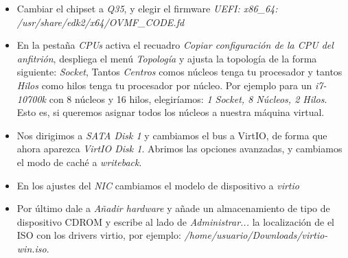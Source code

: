\documentclass[12pt]{article}
\begin{document}
\begin{itemize}
\setlength\itemsep{-0.3em}
\item Cambiar el chipset a \emph{Q35}, y elegir el firmware \emph{UEFI: x86\_64: /usr/share/edk2/x64/OVMF\_CODE.fd}
\item En la pestaña \emph{CPUs} activa el recuadro \emph{Copiar configuración de la CPU del anfitrión}, despliega el menú \emph{Topología} y ajusta la topología de la forma siguiente:
 \emph{Socket}, Tantos \emph{Centros} comos núcleos tenga tu procesador y tantos \emph{Hilos} como hilos tenga tu procesador por núcleo. Por ejemplo para un \emph{i7-10700k} con 8 núcleos y 16 hilos, elegiríamos: \emph{1 Socket, 8 Núcleos, 2 Hilos}. Esto es, si queremos asignar todos los núcleos a nuestra máquina virtual.
\item Nos dirigimos a \emph{SATA Disk 1} y cambiamos el bus a VirtIO, de forma que ahora aparezca \emph{VirtIO Disk 1}. Abrimos las opciones avanzadas, y cambiamos el modo de caché a \emph{writeback}.
\item En los ajustes del \emph{NIC} cambiamos el modelo de dispositivo a \emph{virtio}
\item Por último dale a \emph{Añadir hardware} y añade un almacenamiento de tipo de dispositivo CDROM y escribe al lado de \emph{Administrar...} la localización de el ISO con los drivers virtio, por ejemplo: \emph{/home/usuario/Downloads/virtio-win.iso}.
\end{itemize}
\end{document}
